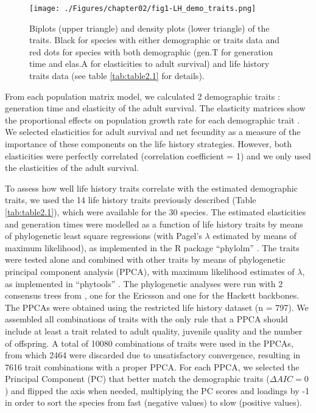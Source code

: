 \begin{figure}
\centering
\texttt{[image: ./Figures/chapter02/fig1-LH\_demo\_traits.png]}
\caption[Traits distribution]{
Biplots (upper triangle) and density plots (lower triangle) of the traits. 
Black for species with either demographic or traits data and red dots for 
species with both demographic (gen.T for generation time and elas.A for 
elasticities to adult survival) and life history traits data (see table 
\ref{tab:table2.1} for details).}
\label{fig:fig2.1}
\end{figure}

From each population matrix model, we calculated 2 demographic 
traits \citep{Caswell2001,Stubben2007}: generation time and elasticity of the 
adult survival. The elasticity matrices show the proportional effects on 
population growth rate for each demographic trait \citep{deKroon2000}⁠. We 
selected elasticities for adult survival and net fecundity as a measure of the 
importance of these components on the life history strategies. However, both 
elasticities were perfectly correlated (correlation coefficient = 1) and we only 
used the elasticities of the adult survival.

To assess how well life history traits correlate with the estimated demographic 
traits, we used the 14 life history traits previously described (Table 
\ref{tab:table2.1}), which were available for the 30 species. The estimated 
elasticities and generation times were modelled as a function of life history 
traits by means of phylogenetic least square regressions (with Pagel’s 
$\lambda$ estimated by means of maximum likelihood), as implemented in the R 
package “phylolm” \citep{Ho2014}⁠. The traits were tested alone and combined 
with other traits by means of phylogenetic principal component analysis 
(PPCA), with maximum likelihood estimates of $\lambda$, as implemented in 
“phytools” \citep{Revell2009a}⁠. The phylogenetic analyses were run with 
2 consensus trees from \citet{Jetz2012}, one for the Ericsson and 
one for the Hackett backbones.
The PPCAs were obtained using the restricted life history dataset (n = 797). We 
assembled all combinations of traits with the only rule that a PPCA should 
include at least a trait related to adult quality, juvenile quality and the 
number of offspring. A total of 10080 combinations of traits were used in the 
PPCAs, from which 2464 were discarded due to unsatisfactory convergence, 
resulting in 7616 trait combinations with a proper PPCA. For each PPCA, we 
selected the Principal Component (PC) that better match the demographic traits 
($\Delta AIC = 0$) and flipped the axis when 
needed, multiplying the PC scores and loadings by -1 in order to sort the 
species from fast (negative values) to slow (positive values).

